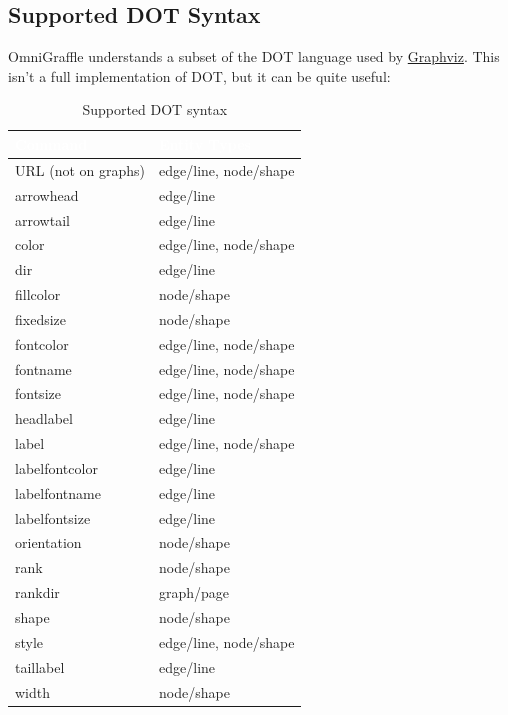 \documentclass[../main.tex]{subfiles}
\begin{document}
\subsection{Supported DOT Syntax}

OmniGraffle understands a subset of the DOT language used by
\href{http://www.graphviz.org}{Graphviz}. This isn't a full implementation of DOT, but it can
be quite useful:

\begingroup
\small
\setlength{\LTleft}{0.075\textwidth}
\setlength{\LTright}{0.075\textwidth}
\renewcommand{\arraystretch}{1.25}
\begin{xltabular}{0.85\textwidth}{|l|>{\raggedright\arraybackslash}X|}
  \caption{Supported DOT syntax}\\
  \hline
  \textcolor{white}{\textbf{Command}} & \textcolor{white}{\textbf{Entity Types}} \\
  \hline
  \endhead
  \hline
  \endfoot
  URL (not on graphs) & edge/line, node/shape \\
  \hline
  arrowhead & edge/line \\
  \hline
  arrowtail & edge/line \\
  \hline
  color & edge/line, node/shape \\
  \hline
  dir & edge/line \\
  \hline
  fillcolor & node/shape \\
  \hline
  fixedsize & node/shape \\
  \hline
  fontcolor & edge/line, node/shape \\
  \hline
  fontname & edge/line, node/shape \\
  \hline
  fontsize & edge/line, node/shape \\
  \hline
  headlabel & edge/line \\
  \hline
  label & edge/line, node/shape \\
  \hline
  labelfontcolor & edge/line \\
  \hline
  labelfontname & edge/line \\
  \hline
  labelfontsize & edge/line \\
  \hline
  orientation & node/shape \\
  \hline
  rank & node/shape \\
  \hline
  rankdir & graph/page \\
  \hline
  shape & node/shape \\
  \hline
  style & edge/line, node/shape \\
  \hline
  taillabel & edge/line \\
  \hline
  width & node/shape \\
  \hline
\end{xltabular}
\endgroup
\end{document}
